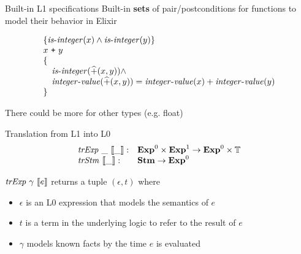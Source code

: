 \documentclass{beamer}
\begin{document}
  \begin{frame}{Built-in L1 specifications}
    Built-in \textbf{sets} of pair/postconditions for functions to 
    model their behavior in Elixir

    \pause

    \[
      \begin{array}{l}
      \{ \mathit{is\mbox{-}integer}(x) \wedge \mathit{is\mbox{-}integer}(y) \}\\
      x~\texttt{+}~y\\
      \{ \\ 
      \quad\mathit{is\mbox{-}integer}(\widehat{+}(x, y)) \wedge \\
      \quad\mathit{integer\mbox{-}value}(\widehat{+}(x, y)) = \mathit{integer\mbox{-}value}(x) + \mathit{integer\mbox{-}value}(y) \\
      \}
      \end{array}
    \]

    \pause

    There could be more for other types (e.g. float)
  \end{frame}
  \begin{frame}{Translation from L1 into L0}
    \[
      \begin{array}{ll}
        \mathit{trExp}~\_~\llbracket\_\rrbracket : & \mathbf{Exp}^{0} \times \mathbf{Exp}^{1} \rightarrow \mathbf{Exp}^{0} \times \mathbb{T}\\
        \mathit{trStm}~\llbracket\_\rrbracket : & \mathbf{Stm} \rightarrow \mathbf{Exp}^{0}
      \end{array}
    \]

    \pause

    $\mathit{trExp}~\gamma~\llbracket e\rrbracket$ returns a tuple $(\epsilon, t)$ where
    \begin{itemize}
      \item \pause $\epsilon$ is an L0 expression that models the semantics of $e$
      \item \pause $t$ is a term in the underlying logic to refer to the result of $e$
      \item \pause $\gamma$ models known facts by the time $e$ is evaluated
    \end{itemize}
  \end{frame}
\end{document}

